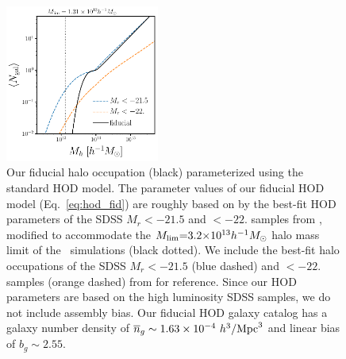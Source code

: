 \begin{figure}
\begin{center}
    \includegraphics[width=0.45\textwidth]{figs/hod_fid.pdf} 
    \caption{Our fiducial halo occupation (black) parameterized using the
    standard \cite{zheng2007} HOD model. The parameter values of our fiducial
    HOD model (Eq.~\ref{eq:hod_fid}) are roughly based on by the best-fit HOD
    parameters of the SDSS $M_r < -21.5$ and $< -22.$ samples from
    \cite{zheng2007}, modified to accommodate the $M_{\rm lim}{=}3.2{\times}
    10^{13} h^{-1}M_\odot$ halo mass limit of the \quij~simulations (black
    dotted). We include the best-fit halo occupations of the SDSS  $M_r <
    -21.5$ (blue dashed) and $< -22.$ samples (orange dashed) from
    \cite{zheng2007} for reference. Since our HOD parameters are based on the
    high luminosity SDSS samples, we do not include assembly bias.  Our
    fiducial HOD galaxy catalog has a galaxy number density of 
    $\overline{n}_g \sim 1.63\times10^{-4}~h^3/{\rm Mpc}^3$ and linear bias of
    $b_g \sim 2.55$.
    }\label{fig:hod}
\end{center}
\end{figure}


